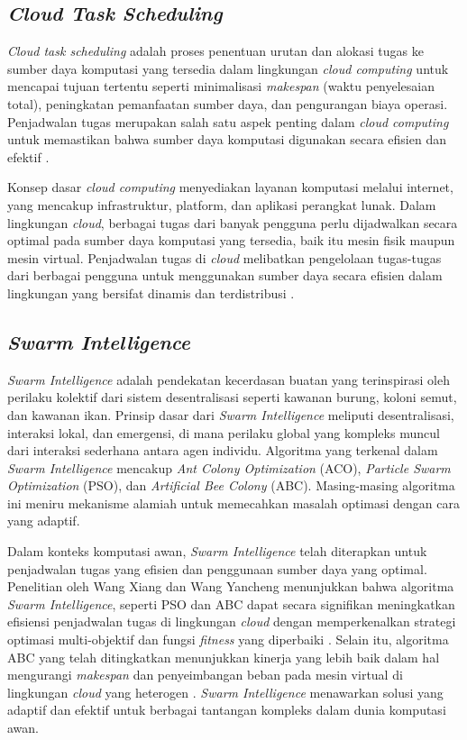 \subsection{\textit{Cloud Task Scheduling}}
\textit{Cloud task scheduling} adalah proses penentuan urutan dan alokasi tugas ke sumber daya komputasi yang tersedia dalam lingkungan \textit{cloud computing} untuk mencapai tujuan tertentu seperti minimalisasi \textit{makespan} (waktu penyelesaian total), peningkatan pemanfaatan sumber daya, dan pengurangan biaya operasi. Penjadwalan tugas merupakan salah satu aspek penting dalam \textit{cloud computing} untuk memastikan bahwa sumber daya komputasi digunakan secara efisien dan efektif \parencite{Awad2022}.

Konsep dasar \textit{cloud computing} menyediakan layanan komputasi melalui internet, yang mencakup infrastruktur, platform, dan aplikasi perangkat lunak. Dalam lingkungan \textit{cloud}, berbagai tugas dari banyak pengguna perlu dijadwalkan secara optimal pada sumber daya komputasi yang tersedia, baik itu mesin fisik maupun mesin virtual. Penjadwalan tugas di \textit{cloud} melibatkan pengelolaan tugas-tugas dari berbagai pengguna untuk menggunakan sumber daya secara efisien dalam lingkungan yang bersifat dinamis dan terdistribusi \parencite{Buyya2009}.

\subsection{\textit{Swarm Intelligence}}
\textit{Swarm Intelligence} adalah pendekatan kecerdasan buatan yang terinspirasi oleh perilaku kolektif dari sistem desentralisasi seperti kawanan burung, koloni semut, dan kawanan ikan. Prinsip dasar dari \textit{Swarm Intelligence} meliputi desentralisasi, interaksi lokal, dan emergensi, di mana perilaku global yang kompleks muncul dari interaksi sederhana antara agen individu. Algoritma yang terkenal dalam \textit{Swarm Intelligence} mencakup \textit{Ant Colony Optimization} (ACO), \textit{Particle Swarm Optimization} (PSO), dan \textit{Artificial Bee Colony} (ABC). Masing-masing algoritma ini meniru mekanisme alamiah untuk memecahkan masalah optimasi dengan cara yang adaptif.

Dalam konteks komputasi awan, \textit{Swarm Intelligence} telah diterapkan untuk penjadwalan tugas yang efisien dan penggunaan sumber daya yang optimal. Penelitian oleh Wang Xiang dan Wang Yancheng menunjukkan bahwa algoritma \textit{Swarm Intelligence}, seperti PSO dan ABC dapat secara signifikan meningkatkan efisiensi penjadwalan tugas di lingkungan \textit{cloud} dengan memperkenalkan strategi optimasi multi-objektif dan fungsi \textit{fitness} yang diperbaiki \parencite{Xiang2023}. Selain itu, algoritma ABC yang telah ditingkatkan menunjukkan kinerja yang lebih baik dalam hal mengurangi \textit{makespan} dan penyeimbangan beban pada mesin virtual di lingkungan \textit{cloud} yang heterogen \parencite{Kimpan2016}. \textit{Swarm Intelligence} menawarkan solusi yang adaptif dan efektif untuk berbagai tantangan kompleks dalam dunia komputasi awan.

